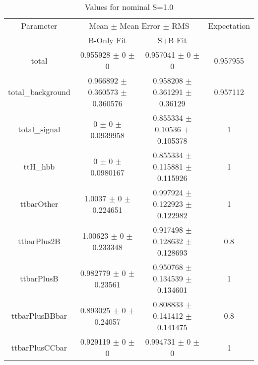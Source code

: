 \begin{table}
\centering
\caption{Values for nominal S=1.0}
\begin{tabular}{cccc}
\toprule
Parameter & \multicolumn{2}{c}{Mean $\pm$ Mean Error $\pm$ RMS} & Expectation\\
 & B-Only Fit & S+B Fit & \\
\midrule
total & \num{0.955928} $\pm$ \num{0} $\pm$ \num{0} & \num{0.957041} $\pm$ \num{0} $\pm$ \num{0} & \num{0.957955}\\
total\_background & \num{0.966892} $\pm$ \num{0.360573} $\pm$ \num{0.360576} & \num{0.958208} $\pm$ \num{0.361291} $\pm$ \num{0.36129} & \num{0.957112}\\
total\_signal & \num{0} $\pm$ \num{0} $\pm$ \num{0.0939958} & \num{0.855334} $\pm$ \num{0.10536} $\pm$ \num{0.105378} & \num{1}\\
ttH\_hbb & \num{0} $\pm$ \num{0} $\pm$ \num{0.0980167} & \num{0.855334} $\pm$ \num{0.115881} $\pm$ \num{0.115926} & \num{1}\\
ttbarOther & \num{1.0037} $\pm$ \num{0} $\pm$ \num{0.224651} & \num{0.997924} $\pm$ \num{0.122923} $\pm$ \num{0.122982} & \num{1}\\
ttbarPlus2B & \num{1.00623} $\pm$ \num{0} $\pm$ \num{0.233348} & \num{0.917498} $\pm$ \num{0.128632} $\pm$ \num{0.128693} & \num{0.8}\\
ttbarPlusB & \num{0.982779} $\pm$ \num{0} $\pm$ \num{0.23561} & \num{0.950768} $\pm$ \num{0.134539} $\pm$ \num{0.134601} & \num{1}\\
ttbarPlusBBbar & \num{0.893025} $\pm$ \num{0} $\pm$ \num{0.24057} & \num{0.808833} $\pm$ \num{0.141412} $\pm$ \num{0.141475} & \num{0.8}\\
ttbarPlusCCbar & \num{0.929119} $\pm$ \num{0} $\pm$ \num{0} & \num{0.994731} $\pm$ \num{0} $\pm$ \num{0} & \num{1}\\
\bottomrule
\end{tabular}
\end{table}